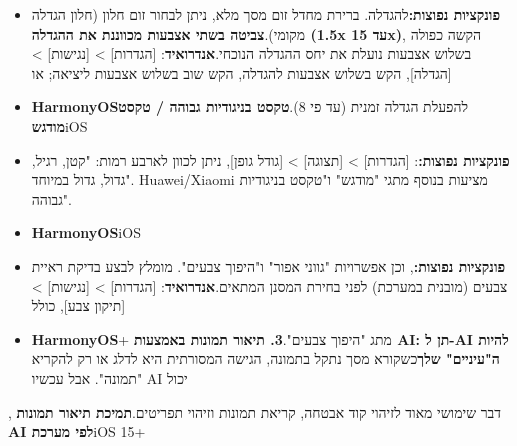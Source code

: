 

\begin{itemize}
  \item \textbf{פונקציות נפוצות:}להגדלה. ברירת מחדל זום מסך מלא, ניתן לבחור זום חלון (חלון הגדלה מקומי).\textbf{צביטה בשתי אצבעות מכווננת את ההגדלה (1.5x עד 15x)}, הקשה כפולה בשלוש אצבעות נועלת את יחס ההגדלה הנוכחי.\textbf{אנדרואיד}: [הגדרות] > [נגישות] > [הגדלה], הקש בשלוש אצבעות להגדלה, הקש שוב בשלוש אצבעות ליציאה; או
  \item \textbf{HarmonyOS}להפעלת הגדלה זמנית (עד פי 8).\textbf{טקסט בניגודיות גבוהה / טקסט מודגש}iOS
\end{itemize}


\begin{itemize}
  \item \textbf{פונקציות נפוצות:}: [הגדרות] > [תצוגה] > [גודל גופן], ניתן לכוון לארבע רמות: "קטן, רגיל, גדול, גדול במיוחד". Huawei/Xiaomi מציעות בנוסף מתגי "מודגש" ו"טקסט בניגודיות גבוהה".
  \item \textbf{HarmonyOS}iOS
\end{itemize}


\begin{itemize}
  \item \textbf{פונקציות נפוצות:}, וכן אפשרויות "גווני אפור" ו"היפוך צבעים". מומלץ לבצע בדיקת ראיית צבעים (מובנית במערכת) לפני בחירת המסנן המתאים.\textbf{אנדרואיד}: [הגדרות] > [נגישות] > [תיקון צבע], כולל
  \item \textbf{HarmonyOS}+ מתג "היפוך צבעים".\textbf{3. תיאור תמונות באמצעות AI: תן ל-AI להיות ה"עיניים" שלך}כשקורא מסך נתקל בתמונה, הגישה המסורתית היא לדלג או רק להקריא "תמונה". אבל עכשיו AI יכול
\end{itemize}


, דבר שימושי מאוד לזיהוי קוד אבטחה, קריאת תמונות וזיהוי תפריטים.\textbf{תמיכת תיאור תמונות AI לפי מערכת}iOS 15+

